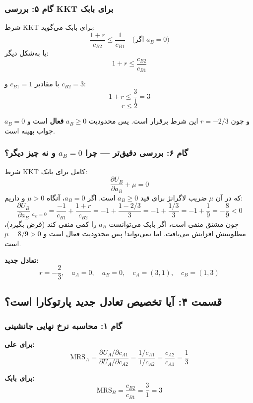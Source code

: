 \documentclass[12pt,a4paper]{article}
\newcommand{\MRS}{\mathrm{MRS}}
\begin{document}
\subsubsection{گام ۵: بررسی KKT برای بابک}

شرط KKT برای بابک می‌گوید:
\[
	\frac{1+r}{c_{B2}} \leq \frac{1}{c_{B1}} \quad \text{(اگر } a_B = 0 \text{)}
\]
یا به‌شکل دیگر:
\[
	1+r \leq \frac{c_{B2}}{c_{B1}}
\]

با مقادیر $c_{B1} = 1$ و $c_{B2} = 3$:
\[
	1+r \leq \frac{3}{1} = 3
\]
\[
	r \leq 2
\]

و چون $r = -2/3$ این شرط برقرار است. پس محدودیت $a_B \geq 0$ \textbf{فعال} است و $a_B = 0$ جواب بهینه است.

\subsubsection{گام ۶: بررسی دقیق‌تر — چرا $a_B = 0$ و نه چیز دیگر؟}

شرط KKT کامل برای بابک:
\[
	\frac{\partial U_B}{\partial a_B} + \mu = 0
\]
که در آن $\mu$ ضریب لاگرانژ برای قید $a_B \geq 0$ است. اگر $a_B = 0$، آنگاه $\mu > 0$ و داریم:
\[
	\frac{\partial U_B}{\partial a_B} \bigg|_{a_B=0} = \frac{-1}{c_{B1}} + \frac{1+r}{c_{B2}} = -1 + \frac{1-2/3}{3} = -1 + \frac{1/3}{3} = -1 + \frac{1}{9} = -\frac{8}{9} < 0
\]
چون مشتق منفی است، اگر بابک می‌توانست $a_B$ را کمی منفی کند (قرض بگیرد)، مطلوبیتش افزایش می‌یافت. اما نمی‌تواند! پس محدودیت فعال است و $\mu = 8/9 > 0$ است.

\textbf{تعادل جدید:}
\[
	\boxed{r = -\frac{2}{3}, \quad a_A = 0, \quad a_B = 0, \quad c_A = (3, 1), \quad c_B = (1, 3)}
\]

\subsection{قسمت ۴: آیا تخصیص تعادل جدید پارتوکارا است؟}

\subsubsection{گام ۱: محاسبه نرخ نهایی جانشینی}

\textbf{برای علی:}
\[
	\MRS_A = \frac{\partial U_A / \partial c_{A1}}{\partial U_A / \partial c_{A2}} = \frac{1/c_{A1}}{1/c_{A2}} = \frac{c_{A2}}{c_{A1}} = \frac{1}{3}
\]

\textbf{برای بابک:}
\[
	\MRS_B = \frac{c_{B2}}{c_{B1}} = \frac{3}{1} = 3
\]
\end{document}

